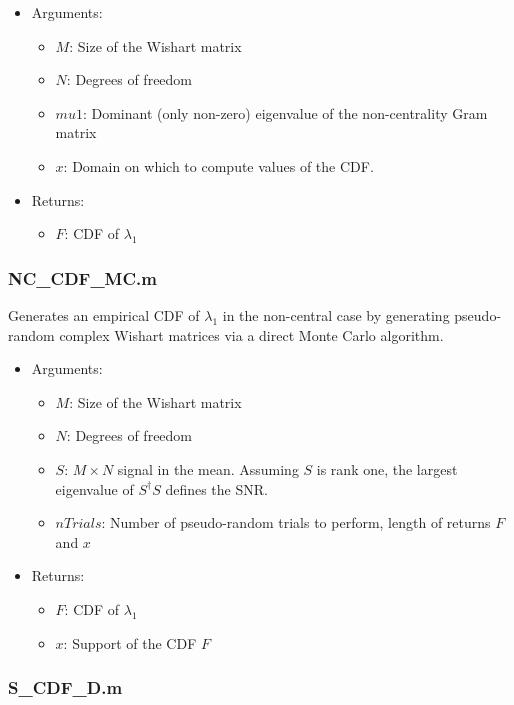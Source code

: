 \begin{itemize}
\item Arguments:
\begin{itemize}
\item $M$: Size of the Wishart matrix
\item $N$: Degrees of freedom
\item $mu1$: Dominant (only non-zero) eigenvalue of the non-centrality Gram matrix
\item $x$: Domain on which to compute values of the CDF.
\end{itemize}
\item Returns:
\begin{itemize}
\item $F$: CDF of $\lambda_1$
\end{itemize}
\end{itemize}




\subsubsection*{NC\_CDF\_MC.m}

Generates an empirical CDF of $\lambda_1$ in the non-central case by generating pseudo-random complex Wishart matrices via a direct Monte Carlo algorithm.

\begin{itemize}
\item Arguments:
\begin{itemize}
\item $M$: Size of the Wishart matrix
\item $N$: Degrees of freedom
\item $S$: $M\times N$ signal in the mean. Assuming $S$ is rank one, the largest eigenvalue of $S^\dagger S$ defines the SNR.
\item $nTrials$: Number of pseudo-random trials to perform, length of returns $F$ and $x$
\end{itemize}
\item Returns:
\begin{itemize}
\item $F$: CDF of $\lambda_1$
\item $x$: Support of the CDF $F$
\end{itemize}
\end{itemize}

\subsubsection*{S\_CDF\_D.m}

